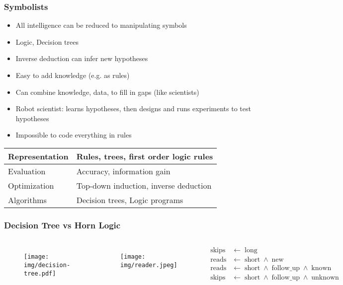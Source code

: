 \documentclass[UTF8,11pt,colorlinks,compress,openany]{beamer}%
\begin{document}
\begin{frame}\frametitle{Symbolists}
\begin{itemize}
	\item All intelligence can be reduced to manipulating symbols
	\item Logic, Decision trees
	\item Inverse deduction can infer new hypotheses
	\item Easy to add knowledge (e.g. as rules)
	\item Can combine knowledge, data, to fill in gaps (like scientists)
	\item Robot scientist: learns hypotheses, then designs and runs experiments to test hypotheses
	\item Impossible to code everything in rules
\end{itemize}
\begin{table}
\abovetabulinesep=1mm
\belowtabulinesep=1mm
\begin{tabu}{l|l}
\hline
Representation &Rules, trees, first order logic rules\\
\hline
Evaluation &Accuracy, information gain\\
\hline
Optimization &Top-down induction, inverse deduction\\
\hline
Algorithms &Decision trees, Logic programs\\
\hline
\end{tabu}
\end{table}
\end{frame}

\begin{frame}\frametitle{Decision Tree vs Horn Logic}
\begin{columns}
\begin{figure}[H]
\texttt{[image: img/decision-tree.pdf]}
\end{figure}
\begin{figure}[H]
\texttt{[image: img/reader.jpeg]}
\end{figure}
\begin{align*}
\operatorname{skips} &\gets \operatorname{long}\\
\operatorname{reads} &\gets \operatorname{short} \wedge \operatorname{new}\\
\operatorname{reads} &\gets \operatorname{short} \wedge \operatorname{follow\_up} \wedge \operatorname{known}\\
\operatorname{skips} &\gets \operatorname{short} \wedge \operatorname{follow\_up} \wedge \operatorname{unknown}
\end{align*}
\end{columns}
\end{frame}
\end{document}
